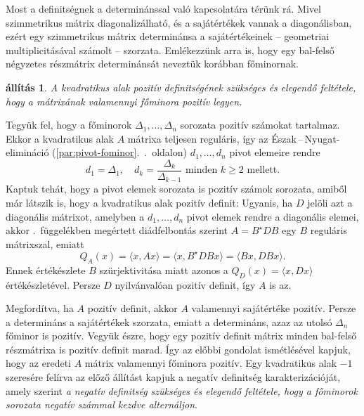 \documentclass[a4paper, showtrims]{memoir}
\makeatletter
\renewenvironment{proof}[1][\proofname]
    {\par\pushQED{\qed}%
    \normalfont \topsep6\p@\@plus6\p@\relax
    \trivlist
    \item[\hskip\labelsep
        \itshape
    #1\@addpunct{:}]\ignorespaces}
    {\popQED\endtrivlist\@endpefalse}
\theoremstyle{plain}
\newtheorem{proposition}{állítás}[chapter]
\theoremstyle{remark}
\theoremstyle{definition}
\newcommand{\ip}[2]{\langle#1,#2\rangle}
\makeatother
\begin{document}
Most a definitségnek a determinánssal való kapcsolatára térünk rá.
Mivel szimmetrikus mátrix diagonalizálható, és a sajátértékek vannak a diagonálisban, ezért egy szimmetrikus mátrix determinánsa a sajátértékeinek -- geometriai multiplicitásával számolt -- szorzata.
Emlékezzünk arra is, hogy egy bal-felső négyzetes részmátrix determinánsát neveztük korábban főminornak.
\begin{proposition}
    A kvadratikus alak pozitív definitségének szükséges és elegendő feltétele,
    hogy a mátrixának valamennyi főminora pozitív legyen.
\end{proposition}
\begin{proof}
    Tegyük fel, hogy a főminorok $\Delta_1,\ldots,\Delta_n$ sorozata pozitív számokat tartalmaz.
    Ekkor a kvadratikus alak $A$ mátrixa teljesen reguláris, 
    így az Észak\,--\,Nyugat-elimináció 
    (\ref{par:pivot-fominor}.~\aazt{\pageref{par:pivot-fominor}}.~oldalon)
    $d_1,\dots,d_n$ pivot elemeire rendre
    \[
        d_1=\Delta_1,
        \quad
        d_k=\frac{\Delta_k}{\Delta_{k-1}}
        \text{ minden } k\geq 2 \text{ mellett.}
    \]
    Kaptuk tehát, hogy a pivot elemek sorozata is pozitív számok sorozata, 
    amiből már látszik is, hogy a kvadratikus alak pozitív definit:
    Ugyanis, ha $D$ jelöli azt a diagonális mátrixot, amelyben 
    a $d_1,\ldots,d_n$ pivot elemek rendre a diagonális elemei,
    akkor \aazt{\ref{apx:Kvadr}}.~függelékben megértett 
    diádfelbontás szerint $A=B^\star DB$ egy $B$ reguláris mátrixszal,
    emiatt
    \[
        Q_A\left( x \right)=\ip{x}{Ax}=\ip{x}{B^\star DBx}=\ip{Bx}{DBx}.
    \]
    Ennek értékészlete $B$ szürjektivitása miatt azonos a $Q_D\left( x \right)=\ip{x}{Dx}$ értékészletével.
    Persze $D$ nyilvánvalóan pozitív definit, így $A$ is az.

    Megfordítva, ha $A$ pozitív definit, akkor $A$ valamennyi sajátértéke pozitív.
    Persze a determináns a sajátértékek szorzata, emiatt a determináns,
    azaz az utolsó $\Delta_n$ főminor is pozitív.
    Vegyük észre, hogy egy pozitív definit mátrix minden bal-felső részmátrixa is pozitív definit marad.
    Így az előbbi gondolat ismétlésével kapjuk, hogy az eredeti $A$ mátrix valamennyi főminora pozitív.
\end{proof}
Egy kvadratikus alak $-1$ szeresére felírva az előző állítást kapjuk a negatív definitség karakterizációját, amely szerint 
\emph{a negatív definitség szükséges és elegendő feltétele, hogy a főminorok sorozata negatív számmal kezdve alternáljon}.
\end{document}
